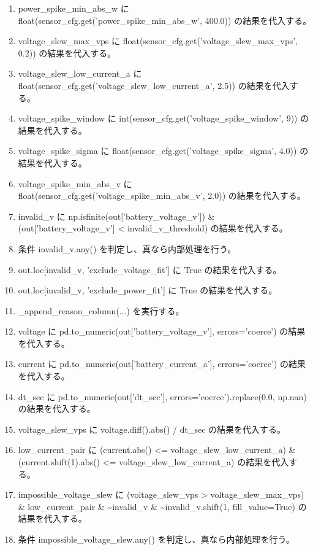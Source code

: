 \documentclass[a4paper,11pt]{article}
\begin{document}
\begin{enumerate}[leftmargin=1.8em]
\item power\_spike\_min\_abs\_w に float(sensor\_cfg.get('power\_spike\_min\_abs\_w', 400.0)) の結果を代入する。
\item voltage\_slew\_max\_vps に float(sensor\_cfg.get('voltage\_slew\_max\_vps', 0.2)) の結果を代入する。
\item voltage\_slew\_low\_current\_a に float(sensor\_cfg.get('voltage\_slew\_low\_current\_a', 2.5)) の結果を代入する。
\item voltage\_spike\_window に int(sensor\_cfg.get('voltage\_spike\_window', 9)) の結果を代入する。
\item voltage\_spike\_sigma に float(sensor\_cfg.get('voltage\_spike\_sigma', 4.0)) の結果を代入する。
\item voltage\_spike\_min\_abs\_v に float(sensor\_cfg.get('voltage\_spike\_min\_abs\_v', 2.0)) の結果を代入する。
\item invalid\_v に np.isfinite(out['battery\_voltage\_v']) \& (out['battery\_voltage\_v'] < invalid\_v\_threshold) の結果を代入する。
\item 条件 invalid\_v.any() を判定し、真なら内部処理を行う。
\item   out.loc[invalid\_v, 'exclude\_voltage\_fit'] に True の結果を代入する。
\item   out.loc[invalid\_v, 'exclude\_power\_fit'] に True の結果を代入する。
\item   \_append\_reason\_column(...) を実行する。
\item voltage に pd.to\_numeric(out['battery\_voltage\_v'], errors='coerce') の結果を代入する。
\item current に pd.to\_numeric(out['battery\_current\_a'], errors='coerce') の結果を代入する。
\item dt\_sec に pd.to\_numeric(out['dt\_sec'], errors='coerce').replace(0.0, np.nan) の結果を代入する。
\item voltage\_slew\_vps に voltage.diff().abs() / dt\_sec の結果を代入する。
\item low\_current\_pair に (current.abs() <= voltage\_slew\_low\_current\_a) \& (current.shift(1).abs() <= voltage\_slew\_low\_current\_a) の結果を代入する。
\item impossible\_voltage\_slew に (voltage\_slew\_vps > voltage\_slew\_max\_vps) \& low\_current\_pair \& \textasciitilde{}invalid\_v \& \textasciitilde{}invalid\_v.shift(1, fill\_value=True) の結果を代入する。
\item 条件 impossible\_voltage\_slew.any() を判定し、真なら内部処理を行う。

\end{enumerate}
\end{document}
